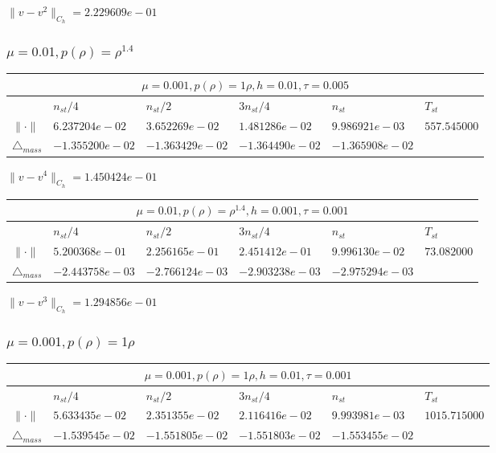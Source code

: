 $\|v-v^{2}\|_{C_h} = 2.229609e-01$
\subsubsection{$\mu = 0.01, p(\rho) = \rho^{1.4} $}

\begin{tabular}{*{6}{|l}|}
    \hline
     \\
    \hline
    &$n_{st}/4 $&$ n_{st}/2$&$3n_{st}/4$&$n_{st}$&$T_{st}$ \\
    \hline
$\|\cdot \|$& $6.237204e-02$ & $3.652269e-02$ & $1.481286e-02$ & $9.986921e-03$ &$557.545000$\\
\hline
$\triangle_{mass}$& $-1.355200e-02$ & $-1.363429e-02$ & $-1.364490e-02$ & $-1.365908e-02$ &\\
\hline
\end{tabular}

$\|v-v^{4}\|_{C_h} = 1.450424e-01$


\begin{tabular}{*{6}{|l}|}
    \hline
     \\
    \hline
    &$n_{st}/4 $&$ n_{st}/2$&$3n_{st}/4$&$n_{st}$&$T_{st}$ \\
    \hline
$\|\cdot \|$& $5.200368e-01$ & $2.256165e-01$ & $2.451412e-01$ & $9.996130e-02$ &$73.082000$\\
\hline
$\triangle_{mass}$& $-2.443758e-03$ & $-2.766124e-03$ & $-2.903238e-03$ & $-2.975294e-03$ &\\
\hline    
\end{tabular}

$\|v-v^{3}\|_{C_h} = 1.294856e-01$

\subsubsection{$\mu = 0.001, p(\rho) = 1\rho $}

\begin{tabular}{*{6}{|l}|}
    \hline
     \\
    \hline
    &$n_{st}/4 $&$ n_{st}/2$&$3n_{st}/4$&$n_{st}$&$T_{st}$ \\
    \hline
    $\|\cdot \|$& $5.633435e-02$ & $2.351355e-02$ & $2.116416e-02$ & $9.993981e-03$ &$1015.715000$\\
\hline
$\triangle_{mass}$& $-1.539545e-02$ & $-1.551805e-02$ & $-1.551803e-02$ & $-1.553455e-02$ &\\
\hline
\end{tabular}

